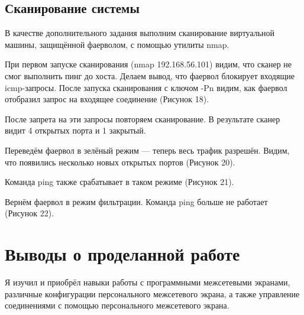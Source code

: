 \FloatBarrier
\clearpage


\subsection{Сканирование системы}

В качестве дополнительного задания выполним сканирование виртуальной машины, защищённой фаерволом, с помощью утилиты nmap. 

При первом запуске сканирования (nmap 192.168.56.101) видим, что сканер не смог выполнить пинг до хоста. Делаем вывод, что фаервол блокирует входящие icmp-запросы.  После запуска сканирования с ключом -Pn видим, как фаервол отобразил запрос на входящее соединение (Рисунок 18).


После запрета на эти запросы повторяем сканирование. В результате сканер видит 4 открытых порта и 1 закрытый.


Переведём фаервол в зелёный режим — теперь весь трафик разрешён. Видим, что появились несколько новых открытых портов (Рисунок 20).


Команда ping также срабатывает в таком режиме (Рисунок 21).


Вернём фаервол в режим фильтрации. Команда ping больше не работает (Рисунок 22).

\FloatBarrier
\clearpage


\section{Выводы о проделанной работе}
Я изучил и приобрёл навыки работы с программными межсетевыми экранами, различные конфигурации персонального межсетевого экрана, а также управление соединениями с помощью персонального межсетевого экрана.

\clearpage
